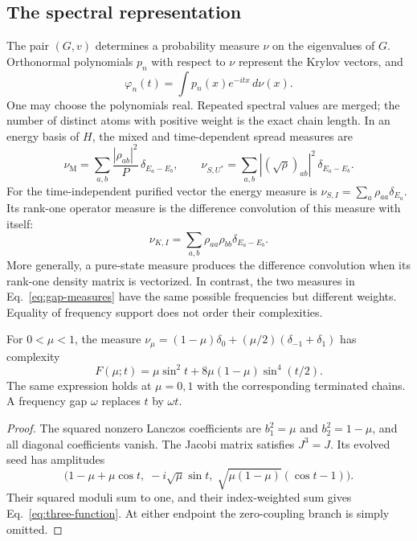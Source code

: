 \subsection{The spectral representation}
The pair $(G,v)$ determines a probability measure $\nu$ on the eigenvalues
of $G$. Orthonormal polynomials $p_n$ with respect to $\nu$ represent the
Krylov vectors, and
\begin{equation}\label{eq:spectral-formula}
 \varphi_n(t)=\int p_n(x)e^{-itx}\,d\nu(x).
\end{equation}
One may choose the polynomials real. Repeated spectral values are merged;
the number of distinct atoms with positive weight is the exact chain length.
In an energy basis of $H$, the mixed and time-dependent spread measures are
\begin{equation}\label{eq:gap-measures}
 \nu_{\mathrm M}=\sum_{a,b}\frac{|\rho_{ab}|^2}{P}\,
       \delta_{E_a-E_b},\qquad
 \nu_{S,U^*}=\sum_{a,b}|(\sqrt\rho)_{ab}|^2\,
       \delta_{E_a-E_b}.
\end{equation}
For the time-independent purified vector the energy measure is
$\nu_{S,I}=\sum_a\rho_{aa}\delta_{E_a}$. Its rank-one operator measure
is the difference convolution of this measure with itself:
\begin{equation}\label{eq:difference-convolution}
 \nu_{K,I}=\sum_{a,b}\rho_{aa}\rho_{bb}\delta_{E_a-E_b}.
\end{equation}
More generally, a pure-state measure produces the difference convolution
when its rank-one density matrix is vectorized. In contrast, the two measures
in Eq.~\eqref{eq:gap-measures} have the same possible frequencies but
different weights. Equality of frequency support does not order their
complexities.

\begin{lemma}\label{lem:three}
For $0<\mu<1$, the measure
$\nu_\mu=(1-\mu)\delta_0+(\mu/2)(\delta_{-1}+\delta_1)$ has
complexity
\begin{equation}\label{eq:three-function}
 F(\mu;t)=\mu\sin^2t+8\mu(1-\mu)\sin^4(t/2).
\end{equation}
The same expression holds at $\mu=0,1$ with the corresponding terminated
chains. A frequency gap $\omega$ replaces $t$ by $\omega t$.
\end{lemma}
\begin{proof}
The squared nonzero Lanczos coefficients are $b_1^2=\mu$ and
$b_2^2=1-\mu$, and all diagonal coefficients vanish. The Jacobi matrix
satisfies $J^3=J$. Its evolved seed has amplitudes
\begin{equation}\label{eq:three-amplitudes}
 \bigl(1-\mu+\mu\cos t,\;-i\sqrt\mu\sin t,\;
 \sqrt{\mu(1-\mu)}(\cos t-1)\bigr).
\end{equation}
Their squared moduli sum to one, and their index-weighted sum gives
Eq.~\eqref{eq:three-function}. At either endpoint the zero-coupling branch
is simply omitted.
\end{proof}

